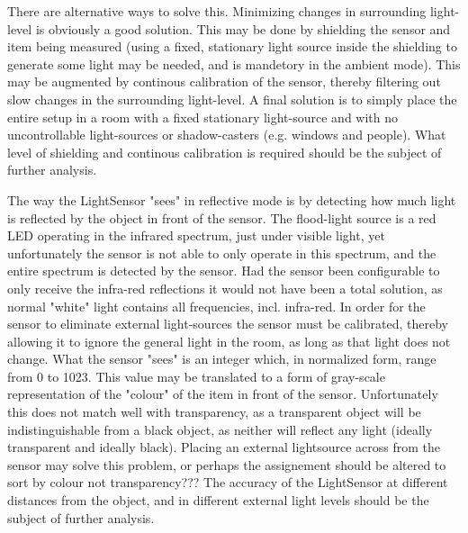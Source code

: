 \documentclass[11pt,a4]{article}
\begin{document}
There are alternative ways to solve this. Minimizing changes in surrounding light-level is obviously a good solution. This may be done by shielding the sensor and item being measured (using a fixed, stationary light source inside the shielding to generate some light may be needed, and is mandetory in the ambient mode). This may be augmented by continous calibration of the sensor, thereby filtering out slow changes in the surrounding light-level. A final solution is to simply place the entire setup in a room with a fixed stationary light-source and with no uncontrollable light-sources or shadow-casters (e.g. windows and people). What level of shielding and continous calibration is required should be the subject of further analysis.

The way the LightSensor "sees" in reflective mode is by detecting how much light is reflected by the object in front of the sensor. The flood-light source is a red LED operating in the infrared spectrum, just under visible light, yet unfortunately the sensor is not able to only operate in this spectrum, and the entire spectrum is detected by the sensor. Had the sensor been configurable to only receive the infra-red reflections it would not have been a total solution, as normal "white" light contains all frequencies, incl. infra-red. In order for the sensor to eliminate external light-sources the sensor must be calibrated, thereby allowing it to ignore the general light in the room, as long as that light does not change. What the sensor "sees" is an integer which, in normalized form, range from 0 to 1023. This value may be translated to a form of gray-scale representation of the "colour" of the item in front of the sensor. Unfortunately this does not match well with transparency, as a transparent object will be indistinguishable from a black object, as neither will reflect any light (ideally transparent and ideally black). Placing an external lightsource across from the sensor may solve this problem, or perhaps the assignement should be altered to sort by colour not transparency??? The accuracy of the LightSensor at different distances from the object, and in different external light levels should be the subject of further analysis.
\end{document}
